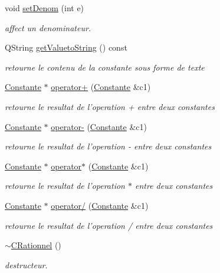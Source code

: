 \begin{DoxyCompactItemize}
void \hyperlink{class_c_rationnel_a3e49f03bc4501f6d71c7c82897dc21c6}{set\-Denom} (int e)
\begin{DoxyCompactList}\small\item\em affect un denominateur. \end{DoxyCompactList}\item 
Q\-String \hyperlink{class_c_rationnel_ab35caed898661511138268547b27514a}{get\-Valueto\-String} () const 
\begin{DoxyCompactList}\small\item\em retourne le contenu de la constante sous forme de texte \end{DoxyCompactList}\item 
\hyperlink{class_constante}{Constante} $\ast$ \hyperlink{class_c_rationnel_ace7aee26a004983cebb7336de1079855}{operator+} (\hyperlink{class_constante}{Constante} \&c1)
\begin{DoxyCompactList}\small\item\em retourne le resultat de l'operation + entre deux constantes \end{DoxyCompactList}\item 
\hyperlink{class_constante}{Constante} $\ast$ \hyperlink{class_c_rationnel_a79afb1dec74f4aed07722a1d496837c4}{operator-\/} (\hyperlink{class_constante}{Constante} \&c1)
\begin{DoxyCompactList}\small\item\em retourne le resultat de l'operation -\/ entre deux constantes \end{DoxyCompactList}\item 
\hyperlink{class_constante}{Constante} $\ast$ \hyperlink{class_c_rationnel_a1e06a24de386d66b8e15d53383e43694}{operator$\ast$} (\hyperlink{class_constante}{Constante} \&c1)
\begin{DoxyCompactList}\small\item\em retourne le resultat de l'operation $\ast$ entre deux constantes \end{DoxyCompactList}\item 
\hyperlink{class_constante}{Constante} $\ast$ \hyperlink{class_c_rationnel_abe7c61d484fe7d3062f45ff43a18cf23}{operator/} (\hyperlink{class_constante}{Constante} \&c1)
\begin{DoxyCompactList}\small\item\em retourne le resultat de l'operation / entre deux constantes \end{DoxyCompactList}\item 
\hypertarget{class_c_rationnel_a49a7282a978004d90500c327f0595af4}{\hyperlink{class_c_rationnel_a49a7282a978004d90500c327f0595af4}{$\sim$\-C\-Rationnel} ()}\label{class_c_rationnel_a49a7282a978004d90500c327f0595af4}

\begin{DoxyCompactList}\small\item\em destructeur. \end{DoxyCompactList}\end{DoxyCompactItemize}


